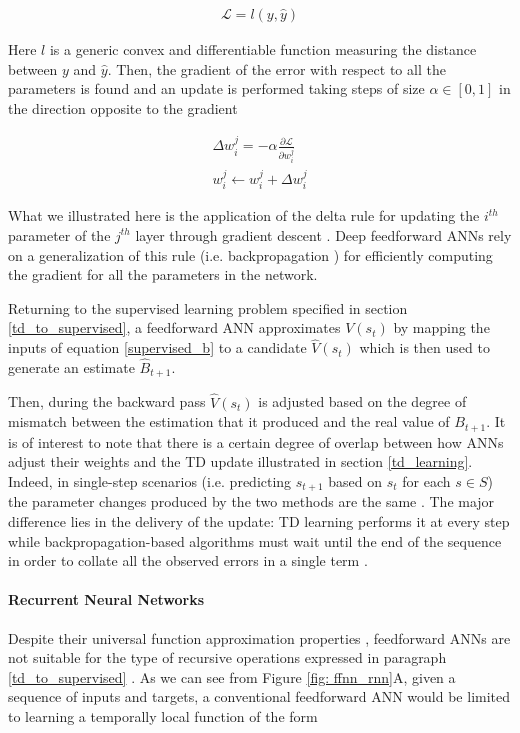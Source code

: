 \begin{gather}
\label{loss}
    \mathcal{L} = l(y, \widehat{y})
\end{gather}

Here $l$ is a generic convex and differentiable function measuring the distance between $y$ and $\widehat{y}$. Then, the gradient of the error with respect to all the parameters is found and an update is performed taking steps of size $\alpha \in [0, 1]$ in the direction opposite to the gradient

\begin{gather}
\label{delta_rule}
    \Delta w^{j}_{i} = -\alpha\frac{\partial \mathcal{L}}{\partial w^{j}_{i}} \\
    w^{j}_{i} \leftarrow w^{j}_{i} + \Delta w^{j}_{i} \nonumber
\end{gather}

What we illustrated here is the application of the delta rule for updating the $i^{th}$ parameter of the $j^{th}$ layer through gradient descent \cite{widrow1960adaptive}. Deep feedforward ANNs rely on a generalization of this rule (i.e. backpropagation \cite{rumelhart1986learning}) for efficiently computing the gradient for all the parameters in the network.  

Returning to the supervised learning problem specified in section \ref{td_to_supervised}, a feedforward ANN approximates $V(s_{t})$ by mapping the inputs of equation \ref{supervised_b} to a candidate $\widehat{V}(s_{t})$ which is then used to generate an estimate $\widehat{B}_{t+1}$. 

Then, during the backward pass $\widehat{V}(s_{t})$ is adjusted based on the degree of mismatch between the estimation that it produced and the real value of $B_{t+1}$. It is of interest to note that there is a certain degree of overlap between how ANNs adjust their weights and the TD update illustrated in section \ref{td_learning}. Indeed, in single-step scenarios (i.e. predicting $s_{t+1}$ based on $s_{t}$ for each $s \in S$) the parameter changes produced by the two methods are the same \cite{sutton1988learning}. The major difference lies in the delivery of the update: TD learning performs it at every step while backpropagation-based algorithms must  wait until the end of the sequence in order to collate all the observed errors in a single term \cite{sutton1988learning}.

\paragraph*{\textbf{Recurrent Neural Networks}}
\label{rnn_theory}
Despite their universal function approximation properties \cite{hornik1989multilayer}, feedforward ANNs are not suitable for the type of recursive operations expressed in paragraph \ref{td_to_supervised} \cite{bengio2017deep}. As we can see from Figure \ref{fig: ffnn_rnn}A, given a sequence of inputs and targets, a conventional feedforward ANN would be limited to learning a temporally local function of the form

